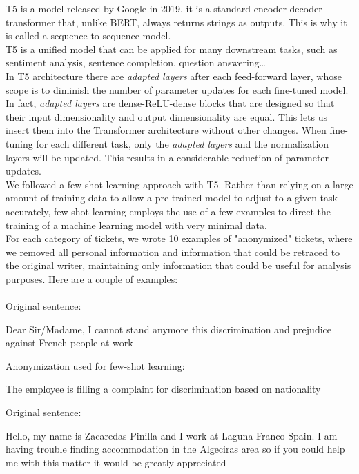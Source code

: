 T5 is a model released by Google in 2019, it is a standard encoder-decoder transformer that, unlike BERT, always returns strings as outputs. This is why it is called a sequence-to-sequence model. \\
T5 is a unified model that can be applied for many downstream tasks, such as sentiment analysis, sentence completion, question answering\dots\\
In T5 architecture there are \textit{adapted layers} after each feed-forward layer, whose scope is to diminish the number of parameter updates for each fine-tuned model. In fact, \textit{adapted layers} are dense-ReLU-dense blocks that are designed so that their input dimensionality and output dimensionality are equal. This lets us insert them into the Transformer architecture without other changes. When fine-tuning for each different task, only the \textit{adapted layers} and the normalization layers will be updated. This results in a considerable reduction of parameter updates.\\
We followed a few-shot learning approach with T5. Rather than relying on a large amount of training data to allow a pre-trained model to adjust to a given task accurately, few-shot learning employs the use of a few examples to direct the training of a machine learning model with very minimal data. \\
For each category of tickets, we wrote 10 examples of "anonymized" tickets, where we removed all personal information and information that could be retraced to the original writer, maintaining only information that could be useful for analysis purposes.
Here are a couple of examples:\\ \\
Original sentence:
\begin{adjustwidth}{1cm}{}
    Dear Sir/Madame, I cannot stand anymore this discrimination and prejudice against French people at work
\end{adjustwidth}
Anonymization used for few-shot learning:
\begin{adjustwidth}{1cm}{}
    The employee is filling a complaint for discrimination based on nationality 
\end{adjustwidth}
Original sentence:
\begin{adjustwidth}{1cm}{}
    Hello, my name is Zacaredas Pinilla and I work at Laguna-Franco Spain. I am having trouble finding accommodation in the Algeciras area so if you could help me with this matter it would be greatly appreciated
\end{adjustwidth}
